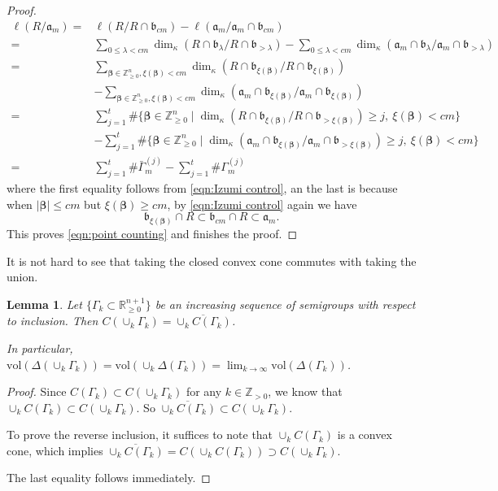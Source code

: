 \documentclass[11pt, leqno]{amsart}%
\theoremstyle{plain}
\newtheorem{lemma}[theorem]{Lemma}
\theoremstyle{definition}
\theoremstyle{remark}
\newcommand{\bR}{\mathbb{R}}
\newcommand{\bZ}{\mathbb{Z}}
\newcommand{\fa}{\mathfrak{a}}
\newcommand{\fb}{\mathfrak{b}}
\newcommand{\vol}{\mathrm{vol}}
\numberwithin{equation}{section}
\begin{document}
\begin{proof}
	
    \begin{align*}
        \ell(R/\fa_m)=&\ell(R/R\cap\fb_{cm})-\ell(\fa_m/\fa_m\cap\fb_{cm})\\
        =&\sum_{0\le\lambda<cm} \dim_\kappa (R\cap\fb_{\lambda}/R\cap\fb_{>\lambda})-\sum_{0\le\lambda<cm} \dim_\kappa (\fa_m\cap\fb_{\lambda}/\fa_m\cap\fb_{>\lambda})\\
        =&\sum_{\bm\beta\in\bZ^n_{\ge 0},\xi(\bm\beta)<cm} \dim_\kappa (R\cap\fb_{\xi(\bm\beta)}/R\cap\fb_{\xi(\bm\beta)})\\
        &-\sum_{\bm\beta\in\bZ^n_{\ge 0},\xi(\bm\beta)<cm} \dim_\kappa (\fa_m\cap\fb_{\xi(\bm\beta)}/\fa_m\cap\fb_{\xi(\bm\beta)})\\
        =&\sum_{j=1}^t\#\{\bm\beta\in\bZ^n_{\ge 0}\mid \dim_\kappa (R\cap \fb_{\xi(\bm\beta)}/R\cap \fb_{>\xi(\bm\beta)})\ge j,\ \xi(\bm\beta)<cm\}\\
        &-\sum_{j=1}^t\#\{\bm\beta\in\bZ^n_{\ge 0}\mid \dim_\kappa (\fa_m\cap \fb_{\xi(\bm\beta)}/\fa_m\cap \fb_{>\xi(\bm\beta)})\ge j,\ \xi(\bm\beta)<cm\}\\
        =&\sum_{j=1}^t\#\bar\Gamma^{(j)}_m-\sum_{j=1}^t\#\Gamma^{(j)}_m
    \end{align*}
    where the first equality follows from \eqref{eqn:Izumi control}, an the last is because when $|\bm\beta|\le cm$ but $\xi(\bm\beta)\ge cm$, by \eqref{eqn:Izumi control} again we have
    \[
        \fb_{\xi(\bm\beta)}\cap R\subset \fb_{cm}\cap R\subset \fa_m.
    \]
    This proves \eqref{eqn:point counting} and finishes the proof.
\end{proof}

It is not hard to see that taking the closed convex cone commutes with taking the union.

\begin{lemma}\label{lem:commute}
    Let $\{\Gamma_k\subset \bR^{n+1}_{\ge 0}\}$ be an increasing sequence of semigroups with respect to inclusion. Then $C(\cup_k \Gamma_k)=\overline{\cup_k C(\Gamma_k)}$. 
	
    In particular, $\vol(\Delta(\cup_k \Gamma_k))=\vol(\cup_k \Delta(\Gamma_k))=\lim_{k\to\infty} \vol(\Delta(\Gamma_k))$.
\end{lemma}

\begin{proof}
    Since $C(\Gamma_k)\subset C(\cup_k \Gamma_k)$ for any $k\in\bZ_{>0}$, we know that $\cup_k C(\Gamma_k)\subset C(\cup_k \Gamma_k)$. So $\overline{\cup_k C(\Gamma_k)}\subset C(\cup_k \Gamma_k)$. 
	
    To prove the reverse inclusion, it suffices to note that $\cup_k C(\Gamma_k)$ is a convex cone, which implies $\overline{\cup_k C(\Gamma_k)}=C(\cup_k C(\Gamma_k))\supset C(\cup_k \Gamma_k)$. 
	
    The last equality follows immediately.
\end{proof}
\end{document}
